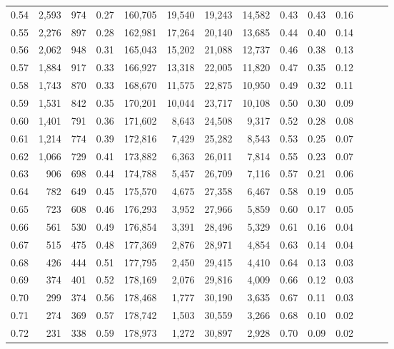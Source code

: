 \begin{tabular}{rrrrrrrrrrrrrr}
0.54 &  2,593 &  974 &  0.27 &  160,705 &   19,540 &  19,243 &  14,582 &  0.43 &  0.43 &      0.16 \\
0.55 &  2,276 &  897 &  0.28 &  162,981 &   17,264 &  20,140 &  13,685 &  0.44 &  0.40 &      0.14 \\
0.56 &  2,062 &  948 &  0.31 &  165,043 &   15,202 &  21,088 &  12,737 &  0.46 &  0.38 &      0.13 \\
0.57 &  1,884 &  917 &  0.33 &  166,927 &   13,318 &  22,005 &  11,820 &  0.47 &  0.35 &      0.12 \\
0.58 &  1,743 &  870 &  0.33 &  168,670 &   11,575 &  22,875 &  10,950 &  0.49 &  0.32 &      0.11 \\
0.59 &  1,531 &  842 &  0.35 &  170,201 &   10,044 &  23,717 &  10,108 &  0.50 &  0.30 &      0.09 \\
0.60 &  1,401 &  791 &  0.36 &  171,602 &    8,643 &  24,508 &   9,317 &  0.52 &  0.28 &      0.08 \\
0.61 &  1,214 &  774 &  0.39 &  172,816 &    7,429 &  25,282 &   8,543 &  0.53 &  0.25 &      0.07 \\
0.62 &  1,066 &  729 &  0.41 &  173,882 &    6,363 &  26,011 &   7,814 &  0.55 &  0.23 &      0.07 \\
0.63 &    906 &  698 &  0.44 &  174,788 &    5,457 &  26,709 &   7,116 &  0.57 &  0.21 &      0.06 \\
0.64 &    782 &  649 &  0.45 &  175,570 &    4,675 &  27,358 &   6,467 &  0.58 &  0.19 &      0.05 \\
0.65 &    723 &  608 &  0.46 &  176,293 &    3,952 &  27,966 &   5,859 &  0.60 &  0.17 &      0.05 \\
0.66 &    561 &  530 &  0.49 &  176,854 &    3,391 &  28,496 &   5,329 &  0.61 &  0.16 &      0.04 \\
0.67 &    515 &  475 &  0.48 &  177,369 &    2,876 &  28,971 &   4,854 &  0.63 &  0.14 &      0.04 \\
0.68 &    426 &  444 &  0.51 &  177,795 &    2,450 &  29,415 &   4,410 &  0.64 &  0.13 &      0.03 \\
0.69 &    374 &  401 &  0.52 &  178,169 &    2,076 &  29,816 &   4,009 &  0.66 &  0.12 &      0.03 \\
0.70 &    299 &  374 &  0.56 &  178,468 &    1,777 &  30,190 &   3,635 &  0.67 &  0.11 &      0.03 \\
0.71 &    274 &  369 &  0.57 &  178,742 &    1,503 &  30,559 &   3,266 &  0.68 &  0.10 &      0.02 \\
0.72 &    231 &  338 &  0.59 &  178,973 &    1,272 &  30,897 &   2,928 &  0.70 &  0.09 &      0.02 \\

\end{tabular}
